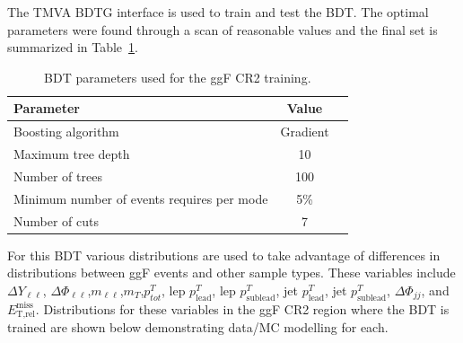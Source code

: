 The TMVA BDTG interface is used to train and test the BDT. The optimal parameters were found through a scan of reasonable values and the final set is summarized in Table~\ref{tab:ggFCR2BDTparameters}.
\begin{table}[h!]
\centering
\begin{tabular}{|l|c|c|}
\hline
Parameter                                    & Value     \\
\hline
Boosting algorithm                           & Gradient \\
Maximum tree depth                           &  10      \\
Number of trees                              &  100    \\
Minimum number of events requires per mode   &  5\%     \\ 
Number of cuts                               &  7       \\
\hline
\end{tabular}
\caption{BDT parameters used for the ggF CR2 training.}
\label{tab:ggFCR2BDTparameters}
\end{table}
For this BDT various distributions are used to take advantage of differences in distributions between ggF events and other sample types. These variables include $\Delta Y_{\ell\ell}$, $\Delta \Phi_{\ell\ell}$,$m_{\ell\ell}$,$m_T$,$p^T_{tot}$, lep $p^T_{\text{lead}}$, lep $p^T_{\text{sublead}}$, jet $p^T_{\text{lead}}$, jet $p^T_{\text{sublead}}$, $\Delta \Phi_{jj}$, and $\ensuremath{E_{\text{T,rel}}^{\text{miss}}}$. Distributions for these variables in the ggF CR2 region where the BDT is trained are shown below demonstrating data/MC modelling for each.
